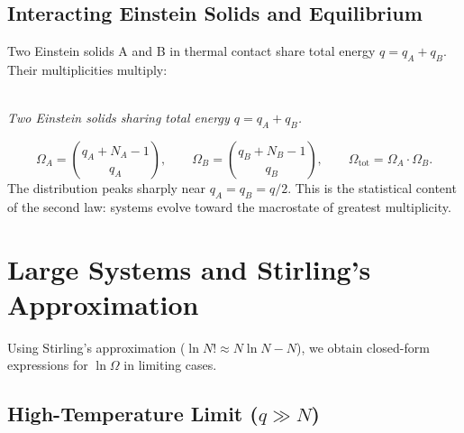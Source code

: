 \subsection{Interacting Einstein Solids and Equilibrium}

Two Einstein solids A and B in thermal contact share total energy $q = q_A + q_B$. Their multiplicities multiply:

\begin{center}
\\[3pt]
{\small\itshape Two Einstein solids sharing total energy $q=q_A+q_B$.}
\end{center}

\[
    \Omega_A = \binom{q_A + N_A - 1}{q_A}, \qquad
    \Omega_B = \binom{q_B + N_B - 1}{q_B}, \qquad
    \Omega_{\text{tot}} = \Omega_A \cdot \Omega_B.
\]
The distribution peaks sharply near $q_A = q_B = q/2$. This is the statistical content of the second law: systems evolve toward the macrostate of greatest multiplicity.

\section{Large Systems and Stirling's Approximation}

Using Stirling's approximation ($\ln N! \approx N\ln N - N$), we obtain closed-form expressions for $\ln\Omega$ in limiting cases.

\subsection{High-Temperature Limit ($q \gg N$)}

